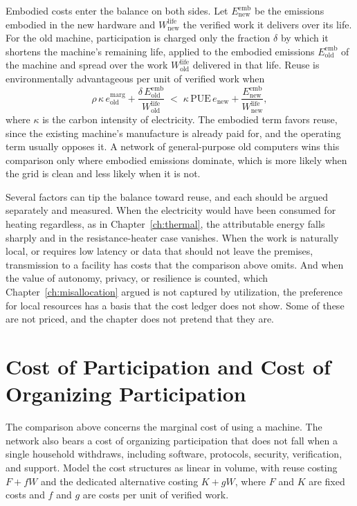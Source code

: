 Embodied costs enter the balance on both sides. Let $E^{\mathrm{emb}}_{\mathrm{new}}$ be the emissions embodied in the new hardware and $W^{\mathrm{life}}_{\mathrm{new}}$ the verified work it delivers over its life. For the old machine, participation is charged only the fraction $\delta$ by which it shortens the machine's remaining life, applied to the embodied emissions $E^{\mathrm{emb}}_{\mathrm{old}}$ of the machine and spread over the work $W^{\mathrm{life}}_{\mathrm{old}}$ delivered in that life. Reuse is environmentally advantageous per unit of verified work when
\[
\rho\,\kappa\,e^{\mathrm{marg}}_{\mathrm{old}}+\frac{\delta\,E^{\mathrm{emb}}_{\mathrm{old}}}{W^{\mathrm{life}}_{\mathrm{old}}}
\;<\;
\kappa\,\mathrm{PUE}\,e_{\mathrm{new}}+\frac{E^{\mathrm{emb}}_{\mathrm{new}}}{W^{\mathrm{life}}_{\mathrm{new}}},
\]
where $\kappa$ is the carbon intensity of electricity. The embodied term favors reuse, since the existing machine's manufacture is already paid for, and the operating term usually opposes it. A network of general-purpose old computers wins this comparison only where embodied emissions dominate, which is more likely when the grid is clean and less likely when it is not.

Several factors can tip the balance toward reuse, and each should be argued separately and measured. When the electricity would have been consumed for heating regardless, as in Chapter~\ref{ch:thermal}, the attributable energy falls sharply and in the resistance-heater case vanishes. When the work is naturally local, or requires low latency or data that should not leave the premises, transmission to a facility has costs that the comparison above omits. And when the value of autonomy, privacy, or resilience is counted, which Chapter~\ref{ch:misallocation} argued is not captured by utilization, the preference for local resources has a basis that the cost ledger does not show. Some of these are not priced, and the chapter does not pretend that they are.

\section{Cost of Participation and Cost of Organizing Participation}

The comparison above concerns the marginal cost of using a machine. The network also bears a cost of organizing participation that does not fall when a single household withdraws, including software, protocols, security, verification, and support. Model the cost structures as linear in volume, with reuse costing $F+fW$ and the dedicated alternative costing $K+gW$, where $F$ and $K$ are fixed costs and $f$ and $g$ are costs per unit of verified work.

